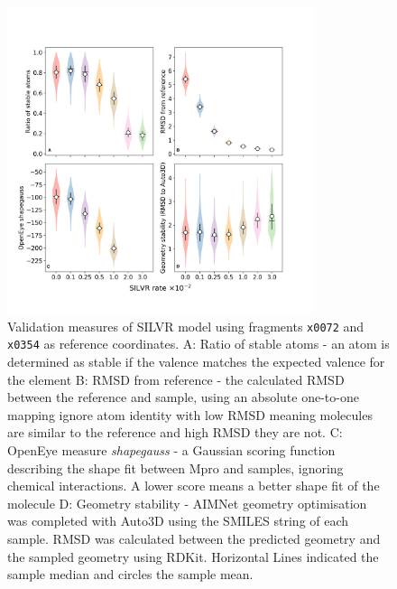 \documentclass[journal=jacsat,manuscript=article]{achemso}
\begin{document}
\begin{figure}[ht!]
    \centering
    \includegraphics[width=0.8\textwidth]{paper/Figures/Fig3/fig_3_metrics_violins.png}
    \caption{Validation measures of SILVR model using fragments \texttt{x0072} and \texttt{x0354} as reference coordinates. A: Ratio of stable atoms - an atom is determined as stable if the valence matches the expected valence for the element B: RMSD from reference - the calculated RMSD between the reference and sample, using an absolute one-to-one mapping ignore atom identity with low RMSD meaning molecules are similar to the reference and high RMSD they are not. C: OpenEye measure \textit{shapegauss} - a Gaussian scoring function describing the shape fit between Mpro and samples, ignoring chemical interactions. A lower score means a better shape fit of the molecule D: Geometry stability - AIMNet geometry optimisation was completed with Auto3D using the SMILES string of each sample. RMSD was calculated between the predicted geometry and the sampled geometry using RDKit. Horizontal Lines indicated the sample median and circles the sample mean.}
    \label{fig:measures}
\end{figure}
\end{document}
